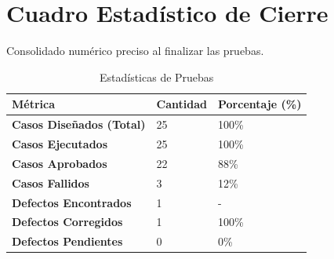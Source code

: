 \section{Cuadro Estadístico de Cierre}
\label{sec:cuadro_estadistico}

Consolidado numérico preciso al finalizar las pruebas.

\begin{table}[H]
    \centering
    \caption{Estadísticas de Pruebas}
    \label{tab:estadisticas_pruebas}
    \begin{tabularx}{\textwidth}{X l l}
        \toprule
        \textbf{Métrica} & \textbf{Cantidad} & \textbf{Porcentaje (\%)} \\
        \midrule
        \textbf{Casos Diseñados (Total)} & 25 & 100\% \\
        \textbf{Casos Ejecutados} & 25 & 100\% \\
        \textbf{Casos Aprobados} & 22 & 88\% \\
        \textbf{Casos Fallidos} & 3 & 12\% \\
        \textbf{Defectos Encontrados} & 1 & - \\
        \textbf{Defectos Corregidos} & 1 & 100\% \\
        \textbf{Defectos Pendientes} & 0 & 0\% \\
        \bottomrule
    \end{tabularx}
\end{table}